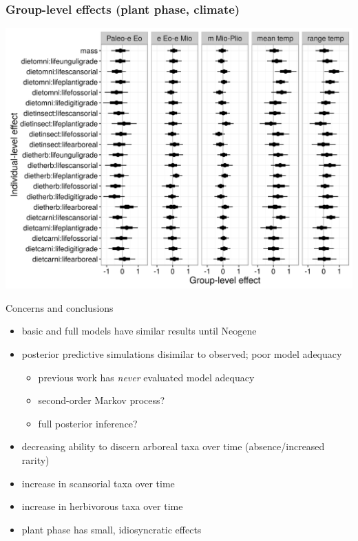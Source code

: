 \documentclass{beamer}
\begin{document}
\begin{frame}
  \frametitle{Group-level effects (plant phase, climate)}
  \begin{center}
    \includegraphics[height=0.8\textheight,width=\textwidth,keepaspectratio=true]{figure/gamma_est_full}
  \end{center}
\end{frame}

\begin{frame}
  \begin{block}{Concerns and conclusions}
    \begin{itemize}
      \item basic and full models have similar results until Neogene
      \item posterior predictive simulations disimilar to observed; poor model adequacy
        \begin{itemize}
          \item previous work has \emph{never} evaluated model adequacy
          \item second-order Markov process?
          \item full posterior inference?
        \end{itemize}
      \item decreasing ability to discern arboreal taxa over time (absence/increased rarity)
      \item increase in scansorial taxa over time
      \item increase in herbivorous taxa over time
      \item plant phase has small, idiosyncratic effects
    \end{itemize}
  \end{block}
\end{frame}
\end{document}

